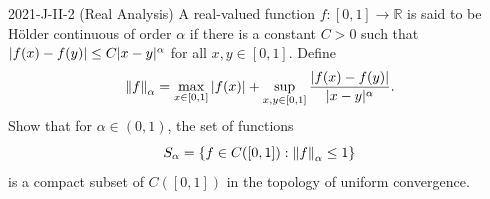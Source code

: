 \documentclass{article}
\begin{document}
\begin{prb}{2021-J-II-2 (Real Analysis)}
	A real-valued function $f: [0,1] \to \mathbb{R}$ is said to be H\"older continuous of order $\alpha$ if there is a constant $C > 0$ such that $\abs{f(x) - f(y)} \leq C|x - y|^{\alpha}$ for all $x, y \in [0,1]$. Define 
		\begin{equation*}
			\norm{f}_{\alpha} = \max_{x \in[0,1]}\abs{f(x)} + \sup_{x, y \in [0,1]}\frac{|f(x) - f(y)|}{|x - y|^{\alpha}}. 
		\end{equation*}
	Show that for $\alpha \in (0,1)$, the set of functions 
		\begin{equation*}
			S_{\alpha} = \brac*{f \in C([0,1]): \norm{f}_{\alpha} \leq 1}
		\end{equation*}
	is a compact subset of $C([0,1])$ in the topology of uniform convergence. 
\end{prb}
\end{document}
